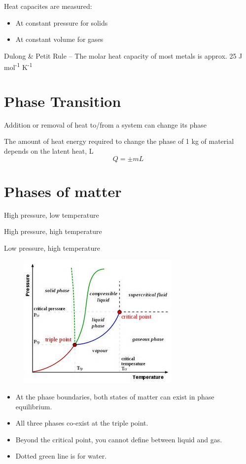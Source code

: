 \documentclass[a4paper, 11pt, normalem]{report}
\begin{document}
Heat capacites are measured:
\begin{itemize}
    \item At constant pressure for solids
    \item At constant volume for gases
\end{itemize}
Dulong \& Petit Rule -- The molar heat capacity of most metals is approx. 25 J mol\textsuperscript{-1} K\textsuperscript{-1}

\section{Phase Transition}
Addition or removal of heat to/from a system can change its phase

The amount of heat energy required to change the phase of 1 kg of material depends on the latent heat, L
\begin{equation}
    Q = \pm mL
\end{equation}

\section{Phases of matter}
\begin{description}[align=right,labelwidth=4cm]
    \item[Solid] High pressure, low temperature 
    \item[Liquid] High pressure, high temperature
    \item[Vapour/gas] Low pressure, high temperature
\end{description}
\begin{figure}[H]
    \centering
    \includegraphics{MatterPhases.jpg}
\end{figure}
\begin{itemize}
    \item At the phase boundaries, both states of matter can exist in phase equilibrium. 
    \item All three phases co-exist at the triple point.
    \item Beyond the critical point, you cannot define between liquid and gas.
    \item Dotted green line is for water.
\end{itemize}
\end{document}
